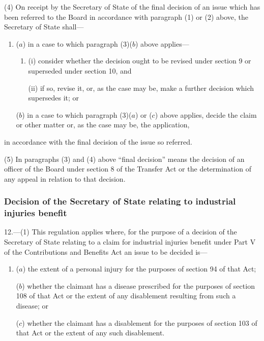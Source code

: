 \documentclass[12pt,a4paper]{article}
\begin{document}
(4) On receipt by the Secretary of State of the final decision of an issue which has been referred to the Board in accordance with paragraph (1) or (2) above, the Secretary of State shall—
\begin{enumerate}\item[]
($a$) in a case to which paragraph (3)($b$) above applies—
\begin{enumerate}\item[]
(i) consider whether the decision ought to be revised under section 9 or superseded under section 10, and

(ii) if so, revise it, or, as the case may be, make a further decision which supersedes it; or
\end{enumerate}

($b$) in a case to which paragraph (3)($a$) or ($c$) above applies, decide the claim or other matter or, as the case may be, the application,
\end{enumerate}
in accordance with the final decision of the issue so referred.

(5) In paragraphs (3) and (4) above “final decision” means the decision of an officer of the Board under section 8 of the Transfer Act or the determination of any appeal in relation to that decision.


\subsubsection[12. Decision of the Secretary of State relating to industrial injuries benefit]{Decision of the Secretary of State relating to industrial injuries benefit}

12.—(1) This regulation applies where, for the purpose of a decision of the Secretary of State relating to a claim for industrial injuries benefit under Part V of the Contributions and Benefits Act an issue to be decided is—
\begin{enumerate}\item[]
($a$) the extent of a personal injury for the purposes of section 94 of that Act;

($b$) whether the claimant has a disease prescribed for the purposes of section 108 of that Act or the extent of any disablement resulting from such a disease; or

($c$) whether the claimant has a disablement for the purposes of section 103 of that Act or the extent of any such disablement.
\end{enumerate}
\end{document}
